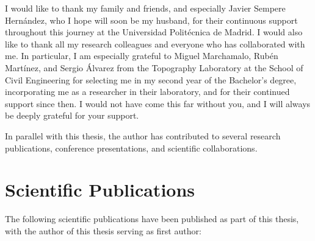 \vspace*{\fill}

\noindent
\hfill
\begin{minipage}{0.7\textwidth}
\raggedleft

I would like to thank my family and friends, and especially Javier Sempere Hernández, who I hope will soon be my husband, for their continuous support throughout this journey at the Universidad Politécnica de Madrid. I would also like to thank all my research colleagues and everyone who has collaborated with me. In particular, I am especially grateful to Miguel Marchamalo, Rubén Martínez, and Sergio Álvarez from the Topography Laboratory at the School of Civil Engineering for selecting me in my second year of the Bachelor’s degree, incorporating me as a researcher in their laboratory, and for their continued support since then. I would not have come this far without you, and I will always be deeply grateful for your support.

\end{minipage}

\newpage


In parallel with this thesis, the author has contributed to several research publications, conference presentations, and scientific collaborations.

\section*{Scientific Publications}

The following scientific publications have been published as part of this thesis, with the author of this thesis serving as first author:

